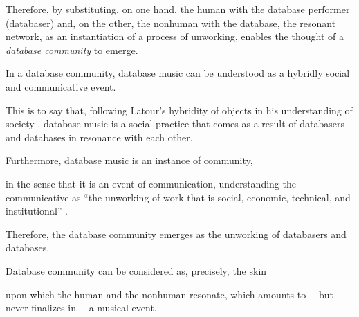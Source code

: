 Therefore, by substituting, on one hand, the human with the database performer (databaser) and, on the other, the nonhuman with the database, the resonant network, as an instantiation of a process of unworking, enables the thought of a \textit{database community} to emerge. 

In a database community, database music can be understood as a hybridly social and communicative event. 

This is to say that, following Latour's hybridity of objects in his understanding of society \parencite[2]{Lat90:On}, database music is a social practice that comes as a result of databasers and databases in resonance with each other. 


Furthermore, database music is an instance of community, 


in the sense that it is an event of communication, understanding the communicative as ``the unworking of work that is social, economic, technical, and institutional'' \parencite[31]{Nan91:The}. 


Therefore, the database community emerges as the unworking of databasers and databases. 

Database community can be considered as, precisely, the skin 

% 

upon which the human and the nonhuman resonate, which amounts to ---but never finalizes in--- a musical event.
